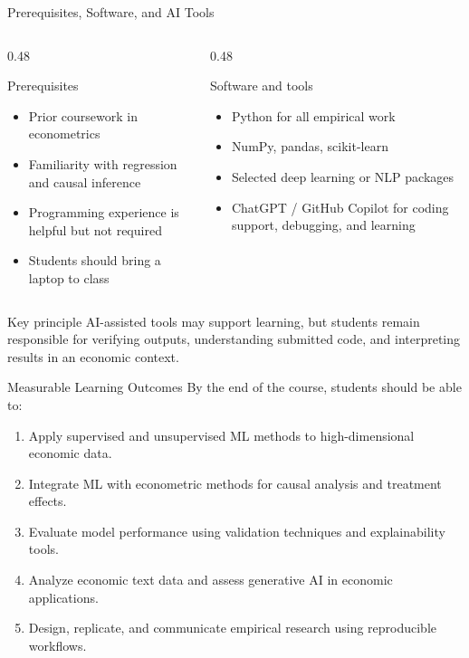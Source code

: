 \documentclass[aspectratio=169,11pt]{beamer}
\begin{document}
\begin{frame}{Prerequisites, Software, and AI Tools}
\begin{columns}[T,onlytextwidth]
\begin{column}{0.48\textwidth}
\begin{block}{Prerequisites}
\begin{itemize}
    \item Prior coursework in econometrics
    \item Familiarity with regression and causal inference
    \item Programming experience is helpful but not required
    \item Students should bring a laptop to class
\end{itemize}
\end{block}
\end{column}
\begin{column}{0.48\textwidth}
\begin{block}{Software and tools}
\begin{itemize}
    \item Python for all empirical work
    \item NumPy, pandas, scikit-learn
    \item Selected deep learning or NLP packages
    \item ChatGPT / GitHub Copilot for coding support, debugging, and learning
\end{itemize}
\end{block}
\end{column}
\end{columns}

\vspace{0.25em}
\begin{alertblock}{Key principle}
AI-assisted tools may support learning, but students remain responsible for verifying outputs, understanding submitted code, and interpreting results in an economic context.
\end{alertblock}
\end{frame}

\begin{frame}{Measurable Learning Outcomes}
By the end of the course, students should be able to:
\vspace{0.25em}
\begin{enumerate}
    \item Apply supervised and unsupervised ML methods to high-dimensional economic data.
    \item Integrate ML with econometric methods for causal analysis and treatment effects.
    \item Evaluate model performance using validation techniques and explainability tools.
    \item Analyze economic text data and assess generative AI in economic applications.
    \item Design, replicate, and communicate empirical research using reproducible workflows.
\end{enumerate}
\end{frame}
\end{document}
